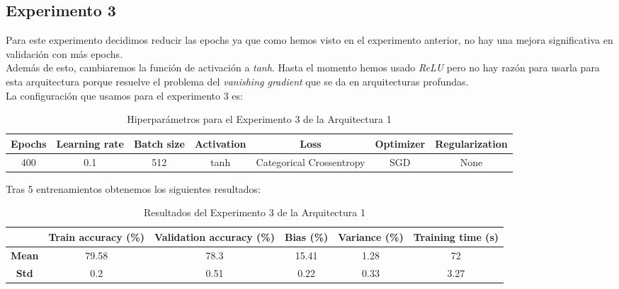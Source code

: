 \documentclass{article}
\begin{document}
		\subsection{Experimento 3}
		\label{s-a1-e3}
			Para este experimento decidimos reducir las epochs ya que como hemos visto en el experimento anterior, no hay una mejora significativa en validaci\'on con m\'as epochs.\\
			Adem\'as de esto, cambiaremos la funci\'on de activaci\'on a \textit{tanh}. Hasta el momento hemos usado \textit{ReLU} pero no hay raz\'on para usarla para esta arquitectura porque resuelve el problema del \textit{vanishing gradient} que se da en arquitecturas profundas.\\
			La configuraci\'on que usamos para el experimento 3 es:
			\begin{table}[h]
			\begin{center}
				\begin{tabular}{| c | c | c | c | c | c | c |}
					\textbf{Epochs} & \textbf{Learning rate} & \textbf{Batch size} & \textbf{Activation} & \textbf{Loss} & \textbf{Optimizer} & \textbf{Regularization} \\ \hline
					400 & 0.1 & 512 & tanh & Categorical Crossentropy & SGD & None
				\end{tabular}
				\caption{Hiperpar\'ametros para el Experimento 3 de la Arquitectura 1}
				\label{tab:hip-a1-e3}
			\end{center}
		\end{table}
			
			Tras 5 entrenamientos obtenemos los siguientes resultados:
			\begin{table}[!h]
				\begin{center}
					\begin{tabular}{ c | c | c | c | c | c |}
						\ & \textbf{Train accuracy (\%)} & \textbf{Validation accuracy (\%)} & \textbf{Bias (\%)} & \textbf{Variance (\%)} & \textbf{Training time (s)} \\ \hline
						\textbf{Mean} & 79.58 & 78.3 & 15.41 & 1.28 & 72\\ \hline
						\textbf{Std} & 0.2 & 0.51 & 0.22 & 0.33 & 3.27 \\ \hline
					\end{tabular}
					\caption{Resultados del Experimento 3 de la Arquitectura 1}
					\label{tab:res-a1-e3}
				\end{center}
			\end{table}
			
\end{document}
